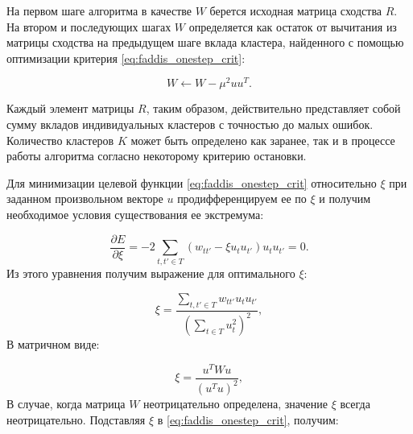 \documentclass[12pt]{article}
\begin{document}
На первом шаге алгоритма в качестве $W$ берется исходная матрица сходства $R$. На втором и последующих шагах $W$ определяется как остаток от вычитания из матрицы сходства на предыдущем шаге вклада кластера, найденного с помощью оптимизации критерия \eqref{eq:faddis_onestep_crit}:

\begin{equation}
	W  \gets W - \mu^2uu^T.
\end{equation}

Каждый элемент матрицы $R$, таким образом, действительно представляет собой сумму вкладов индивидуальных кластеров с точностью до малых ошибок. Количество кластеров $K$ может быть определено как заранее, так и в процессе работы алгоритма согласно некоторому критерию остановки.

Для минимизации целевой функции \eqref{eq:faddis_onestep_crit} относительно $\xi$ при заданном произвольном векторе $u$ продифференцируем ее по $\xi$ и получим необходимое условия существования ее экстремума:

\begin{equation}
	\frac{\partial E}{\partial \xi}= -2\sum_{t,t'\in T}(w_{tt'}-\xi u_t u_{t'}) u_t u_{t'} =0.
\end{equation}
Из этого уравнения получим выражение для оптимального $\xi$:

\begin{equation}
	\xi = \frac{\sum_{t,t'\in T}w_{tt'} u_t u_{t'}}{(\sum_{t \in T}u_t^2)^2},
\end{equation}
В матричном виде:

\begin{equation}
\xi = \frac{u^TWu}{(u^Tu)^2},
\end{equation}
В случае, когда матрица $W$ неотрицательно определена, значение $\xi$ всегда неотрицательно. Подставляя $\xi$ в \eqref{eq:faddis_onestep_crit}, получим:
\end{document}
